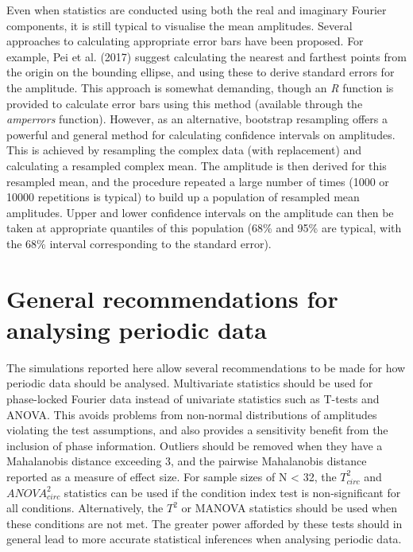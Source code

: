 \documentclass[]{article}
\begin{document}
Even when statistics are conducted using both the real and imaginary Fourier components, it is still typical to visualise the mean amplitudes. Several approaches to calculating appropriate error bars have been proposed. For example, Pei et al. (2017) suggest calculating the nearest and farthest points from the origin on the bounding ellipse, and using these to derive standard errors for the amplitude. This approach is somewhat demanding, though an \emph{R} function is provided to calculate error bars using this method (available through the \emph{amperrors} function). However, as an alternative, bootstrap resampling offers a powerful and general method for calculating confidence intervals on amplitudes. This is achieved by resampling the complex data (with replacement) and calculating a resampled complex mean. The amplitude is then derived for this resampled mean, and the procedure repeated a large number of times (1000 or 10000 repetitions is typical) to build up a population of resampled mean amplitudes. Upper and lower confidence intervals on the amplitude can then be taken at appropriate quantiles of this population (68\% and 95\% are typical, with the 68\% interval corresponding to the standard error).

\hypertarget{general-recommendations-for-analysing-periodic-data}{%
\section{General recommendations for analysing periodic data}\label{general-recommendations-for-analysing-periodic-data}}

The simulations reported here allow several recommendations to be made for how periodic data should be analysed. Multivariate statistics should be used for phase-locked Fourier data instead of univariate statistics such as T-tests and ANOVA. This avoids problems from non-normal distributions of amplitudes violating the test assumptions, and also provides a sensitivity benefit from the inclusion of phase information. Outliers should be removed when they have a Mahalanobis distance exceeding 3, and the pairwise Mahalanobis distance reported as a measure of effect size. For sample sizes of N \textless{} 32, the \(T^2_{circ}\) and \(ANOVA^2_{circ}\) statistics can be used if the condition index test is non-significant for all conditions. Alternatively, the \(T^2\) or MANOVA statistics should be used when these conditions are not met. The greater power afforded by these tests should in general lead to more accurate statistical inferences when analysing periodic data.
\end{document}

